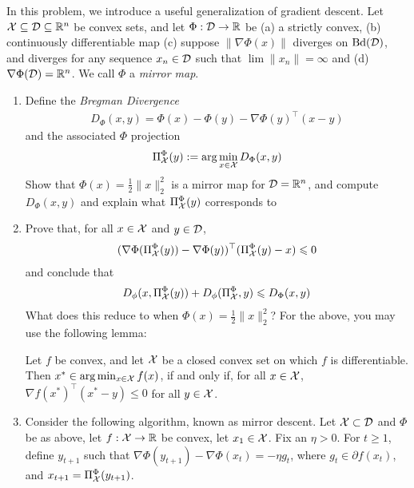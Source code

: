 \documentclass[12pt]{article}
\begin{document}
In this problem, we introduce a useful generalization of gradient descent. Let
${\cal X} \subseteq {\cal D} \subseteq \mathbb{R}^n$ be convex sets, and let $\Phi: {\cal D} \to \mathbb{R}$ be (a)
a strictly convex, (b) continuously differentiable map (c) suppose $\|\nabla
\Phi(x)\|$ diverges on $\mathrm{Bd}({\cal D})$, and diverges for any sequence $x_n \in {\cal D}$ such that $\lim \|x_n\| = \infty$ and (d) $\nabla \Phi({\cal D}) = \mathbb{R}^n$. We call $\Phi$ a \emph{mirror map}.

\begin{enumerate}
\item
Define the \emph{Bregman Divergence}
\begin{eqnarray}
D_{\Phi}(x,y) = \Phi(x) - \Phi(y) - \nabla \Phi(y)^{\top}(x-y)
\end{eqnarray}
and the associated $\Phi$ projection
\begin{eqnarray}
\Pi_{{\cal X}}^{\Phi}(y):= \arg\min_{x \in {\cal X}} D_{\Phi}(x,y)
\end{eqnarray}
Show that $\Phi(x) = \frac{1}{2}\|x\|^2_2$ is a mirror map for ${\cal D} = \mathbb{R}^n$, and compute $D_{\Phi}(x,y)$ and explain what $\Pi_{{\cal X}}^{\Phi}(y)$ corresponds to
\item
Prove that, for all $x \in {\cal X}$ and $y \in {\cal D}$,
\begin{eqnarray}
(\nabla \Phi(\Pi_{{\cal X}}^{\Phi}(y)) - \nabla \Phi(y))^\top(\Pi_{{\cal X}}^{\Phi}(y) - x) \leqslant 0
\end{eqnarray}
and conclude that
\begin{eqnarray}
D_{\phi}(x,\Pi_{{\cal X}}^{\Phi}(y)) + D_{\phi}(\Pi_{{\cal X}}^{\Phi},y) \leqslant D_{\Phi}(x,y) 
\end{eqnarray}
What does this reduce to when $\Phi(x) = \frac{1}{2}\|x\|^2_2$? For the above, you may use the following lemma:
\begin{lemma*} Let $f$ be convex, and let ${\cal X}$ be a closed convex set on which $f$ is differentiable. Then $x^* \in \arg\min_{x \in {\cal X}} f(x)$, if and only if, for all $x \in {\cal X}$, $\nabla f(x^*)^\top ( x^* - y) \le 0$ for all $y \in {\cal X}$.
\end{lemma*}
\item
Consider the following algorithm, known as mirror descent. Let ${\cal X} \subset {\cal D}$ and $\Phi$ be as above, let $f: {\cal X} \to \mathbb{R}$ be convex, let $x_1  \in {\cal X}$. Fix an $\eta > 0$. For $t \ge 1$, define $y_{t+1}$ such that $\nabla \Phi(y_{t+1}) - \nabla \Phi(x_{t}) = -\eta g_t$, where $g_t \in \partial f(x_t)$, and $x_{t+1} = \Pi_{{\cal X}}^{\Phi}(y_{t+1})$. 



\end{enumerate}
\end{document}
